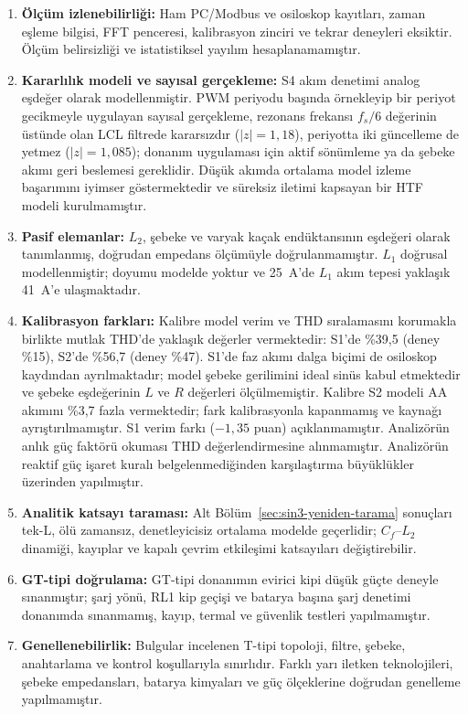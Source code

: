 \begin{enumerate}
  \item \textbf{Ölçüm izlenebilirliği:} Ham PC/Modbus ve osiloskop kayıtları, zaman eşleme bilgisi, FFT penceresi, kalibrasyon zinciri ve tekrar deneyleri eksiktir. Ölçüm belirsizliği ve istatistiksel yayılım hesaplanamamıştır.
  \item \textbf{Kararlılık modeli ve sayısal gerçekleme:} S4 akım denetimi analog eşdeğer olarak modellenmiştir. PWM periyodu başında örnekleyip bir periyot gecikmeyle uygulayan sayısal gerçekleme, rezonans frekansı $f_s/6$ değerinin üstünde olan LCL filtrede kararsızdır ($|z|=1{,}18$), periyotta iki güncelleme de yetmez ($|z|=1{,}085$); donanım uygulaması için aktif sönümleme ya da şebeke akımı geri beslemesi gereklidir. Düşük akımda ortalama model izleme başarımını iyimser göstermektedir ve süreksiz iletimi kapsayan bir HTF modeli kurulmamıştır.
  \item \textbf{Pasif elemanlar:} $L_2$, şebeke ve varyak kaçak endüktansının eşdeğeri olarak tanımlanmış, doğrudan empedans ölçümüyle doğrulanmamıştır. $L_1$ doğrusal modellenmiştir; doyumu modelde yoktur ve \SI{25}{\ampere}'de $L_1$ akım tepesi yaklaşık \SI{41}{\ampere}'e ulaşmaktadır.
  \item \textbf{Kalibrasyon farkları:} Kalibre model verim ve THD sıralamasını korumakla birlikte mutlak THD'de yaklaşık değerler vermektedir: S1'de \%39,5 (deney \%15), S2'de \%56,7 (deney \%47). S1'de faz akımı dalga biçimi de osiloskop kaydından ayrılmaktadır; model şebeke gerilimini ideal sinüs kabul etmektedir ve şebeke eşdeğerinin $L$ ve $R$ değerleri ölçülmemiştir. Kalibre S2 modeli AA akımını \%3,7 fazla vermektedir; fark kalibrasyonla kapanmamış ve kaynağı ayrıştırılmamıştır. S1 verim farkı ($-1{,}35$ puan) açıklanmamıştır. Analizörün anlık güç faktörü okuması THD değerlendirmesine alınmamıştır. Analizörün reaktif güç işaret kuralı belgelenmediğinden karşılaştırma büyüklükler üzerinden yapılmıştır.
  \item \textbf{Analitik katsayı taraması:} Alt Bölüm~\ref{sec:sin3-yeniden-tarama} sonuçları tek-L, ölü zamansız, denetleyicisiz ortalama modelde geçerlidir; $C_f$--$L_2$ dinamiği, kayıplar ve kapalı çevrim etkileşimi katsayıları değiştirebilir.
  \item \textbf{GT-tipi doğrulama:} GT-tipi donanımın evirici kipi düşük güçte deneyle sınanmıştır; şarj yönü, RL1 kip geçişi ve batarya başına şarj denetimi donanımda sınanmamış, kayıp, termal ve güvenlik testleri yapılmamıştır.
  \item \textbf{Genellenebilirlik:} Bulgular incelenen T-tipi topoloji, filtre, şebeke, anahtarlama ve kontrol koşullarıyla sınırlıdır. Farklı yarı iletken teknolojileri, şebeke empedansları, batarya kimyaları ve güç ölçeklerine doğrudan genelleme yapılmamıştır.
\end{enumerate}

